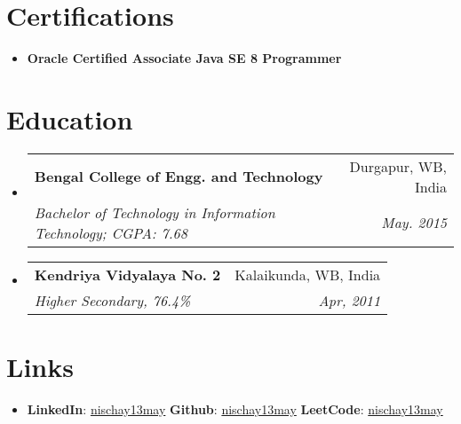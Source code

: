 \documentclass[a4paper, 11pt]{article}
\makeatletter
\newcommand{\resumeItem}[2]{
  \item\small{
    \textbf{#1}{ #2 \vspace{-2pt}}
  }
}
\newcommand{\resumeSubheading}[4]{
  \vspace{-1pt}\item
    \begin{tabular*}{0.97\textwidth}[t]{l@{\extracolsep{\fill}}r}
      \textbf{#1} & #2 \\
      \textit{\small#3} & \textit{\small #4} \\
    \end{tabular*}\vspace{-5pt}
}
\newcommand{\resumeSubItem}[2]{\resumeItem{#1}{#2}\vspace{-4pt}}
\newcommand{\resumeSubHeadingListStart}{\begin{itemize}[leftmargin=*]}
\newcommand{\resumeSubHeadingListEnd}{\end{itemize}}
\makeatother
\begin{document}
\section{Certifications}
    \resumeSubHeadingListStart
    \resumeSubItem{Oracle Certified Associate Java SE 8 Programmer}{}
    \resumeSubHeadingListEnd

\section{Education}
  \resumeSubHeadingListStart
    \resumeSubheading
      {Bengal College of Engg. and Technology}{Durgapur, WB, India}
      {Bachelor of Technology in Information Technology;  CGPA: 7.68}{May. 2015}
    \resumeSubheading
      {Kendriya Vidyalaya No. 2}{Kalaikunda, WB, India}
      {Higher Secondary,  76.4\%}{Apr, 2011}
  \resumeSubHeadingListEnd

\section{Links}
  \resumeSubHeadingListStart
    \item{
      \textbf{LinkedIn}{: \href{https://www.linkedin.com/in/nischay13may/}{nischay13may}}
      \hfill
      \textbf{Github}{: \href{https://github.com//nischay13may/}{nischay13may}}
      \hfill
      \textbf{LeetCode}{: \href{https://leetcode.com/nischay13may/}{nischay13may}}
    }
  \resumeSubHeadingListEnd
\end{document}
